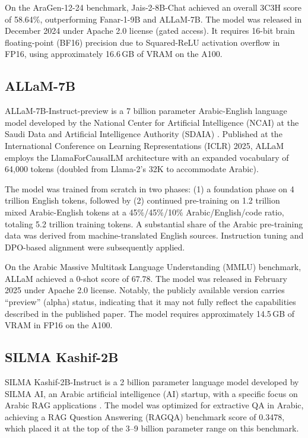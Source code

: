 On the AraGen-12-24 benchmark, Jais-2-8B-Chat achieved an overall 3C3H score of 58.64\%, outperforming Fanar-1-9B and ALLaM-7B. The model was released in December 2024 under Apache 2.0 license (gated access). It requires 16-bit brain floating-point (BF16) precision due to Squared-ReLU activation overflow in FP16, using approximately 16.6\,GB of VRAM on the A100.

\subsection{ALLaM-7B}
\label{sec:allam}

ALLaM-7B-Instruct-preview is a 7 billion parameter Arabic-English language model developed by the National Center for Artificial Intelligence (NCAI) at the Saudi Data and Artificial Intelligence Authority (SDAIA) \cite{bari2025allam}. Published at the International Conference on Learning Representations (ICLR) 2025, ALLaM employs the LlamaForCausalLM architecture with an expanded vocabulary of 64,000 tokens (doubled from Llama-2's 32K to accommodate Arabic).

The model was trained from scratch in two phases: (1) a foundation phase on 4 trillion English tokens, followed by (2) continued pre-training on 1.2 trillion mixed Arabic-English tokens at a 45\%/45\%/10\% Arabic/English/code ratio, totaling 5.2 trillion training tokens. A substantial share of the Arabic pre-training data was derived from machine-translated English sources. Instruction tuning and DPO-based alignment were subsequently applied.

On the Arabic Massive Multitask Language Understanding (MMLU) benchmark, ALLaM achieved a 0-shot score of 67.78. The model was released in February 2025 under Apache 2.0 license. Notably, the publicly available version carries ``preview'' (alpha) status, indicating that it may not fully reflect the capabilities described in the published paper. The model requires approximately 14.5\,GB of VRAM in FP16 on the A100.

\subsection{SILMA Kashif-2B}
\label{sec:silma}

SILMA Kashif-2B-Instruct is a 2 billion parameter language model developed by SILMA AI, an Arabic artificial intelligence (AI) startup, with a specific focus on Arabic RAG applications \cite{silma_2024}. The model was optimized for extractive QA in Arabic, achieving a RAG Question Answering (RAGQA) benchmark score of 0.3478, which placed it at the top of the 3--9 billion parameter range on this benchmark.


